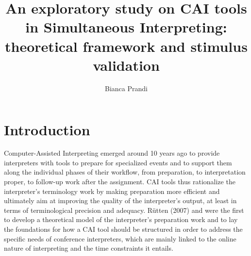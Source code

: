 \documentclass[output=paper]{langsci/langscibook}
\author{Bianca Prandi\affiliation{Affiliation}}
\title{An exploratory study on CAI tools in Simultaneous Interpreting: theoretical framework and stimulus validation}
\begin{document}

 

 

 

 

 

 

 

\section{Introduction}
Computer-Assisted Interpreting emerged around 10 years ago to provide interpreters with tools to prepare for specialized events and to support them along the individual phases of their workflow, from preparation, to interpretation proper, to follow-up work after the assignment. CAI tools thus rationalize the interpreter’s terminology work by making preparation more efficient and ultimately aim at improving the quality of the interpreter’s output, at least in terms of terminological precision and adequacy. Rütten (2007) and \citet{Will2009} were the first to develop a theoretical model of the interpreter’s preparation work and to lay the foundations for how a CAI tool should be structured in order to address the specific needs of conference interpreters, which are mainly linked to the online nature of interpreting and the time constraints it entails.
\end{document}
